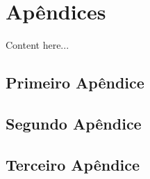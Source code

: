\chapter*{Apêndices}
\hypertarget{apendices}{}  %

\renewcommand{\thesection}{\Alph{section}}

Content here...

\section{Primeiro Apêndice}
\section{Segundo Apêndice}
\section{Terceiro Apêndice}